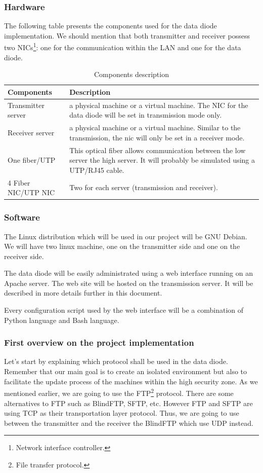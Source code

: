 \documentclass[a4paper,10pt]{article}
\begin{document}
\subsubsection{Hardware}
The following table presents the components used for the data diode implementation. We should mention that both transmitter and receiver possess two NICs\footnote{Network interface controller.}: one for the communication within the LAN and one for the data diode.\bigskip
\begin{table}[!h]
\centering
\begin{tabular}{|p{3cm}|p{10.5cm}|}
	\hline
	\textbf{Components} & \textbf{Description}                 \\
	\hline
	Transmitter server  &  a physical machine or a virtual machine. The NIC for the data diode will be set in transmission mode only. \\
	\hline
	Receiver server  &  a physical machine or a virtual machine. Similar to the transmission, the nic will only be set in a receiver mode.\\
	\hline
	One fiber/UTP & This optical fiber allows communication between the low server the high server. It will probably be simulated using a UTP/RJ45 cable.\\
	\hline
	4 Fiber NIC/UTP NIC & Two for each server (transmission and receiver).  \\
	\hline
\end{tabular}
\caption{Components description}
\label{tab:component}
\end{table}
\subsubsection{Software}
The Linux distribution which will be used in our project will be GNU Debian. We will have two linux machine, one on the transmitter side and one on the receiver side. 

The data diode will be easily administrated using a web interface running on an Apache server. The web site will be hosted on the transmission server. It will be described in more details further in this document.

Every configuration script used by the web interface will be a combination of Python language and Bash language.
\subsubsection{First overview on the project implementation}

Let's start by explaining which protocol shall be used in the data diode. Remember that our main goal is to create an isolated environment but also to facilitate the update process of the machines within the high security zone. As we mentioned earlier, we are going to use the FTP\footnote{File transfer protocol.} protocol. There are some alternatives to FTP such as BlindFTP, SFTP, etc. However FTP and SFTP are using TCP as their transportation layer protocol. Thus, we are going to use between the transmitter and the receiver the BlindFTP which use UDP instead.
\end{document}
